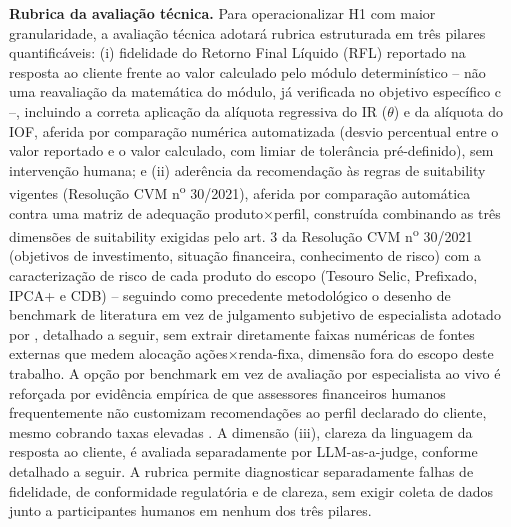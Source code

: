 \textbf{Rubrica da avalia\c{c}\~ao t\'ecnica.} Para operacionalizar H1
com maior granularidade, a avalia\c{c}\~ao t\'ecnica adotar\'a rubrica
estruturada em tr\^es pilares quantific\'aveis: (i) fidelidade do Retorno
Final L\'iquido (RFL) reportado na resposta ao cliente frente ao valor
calculado pelo m\'odulo determin\'istico -- n\~ao uma reavalia\c{c}\~ao
da matem\'atica do m\'odulo, j\'a verificada no objetivo espec\'ifico c
--, incluindo a correta aplica\c{c}\~ao da al\'iquota regressiva do IR
($\theta$) e da al\'iquota do IOF, aferida por compara\c{c}\~ao num\'erica
automatizada (desvio percentual entre o valor reportado e o valor
calculado, com limiar de toler\^ancia pr\'e-definido), sem interven\c{c}\~ao
humana; e (ii) ader\^encia da recomenda\c{c}\~ao \`as regras de
suitability vigentes (Resolu\c{c}\~ao CVM n\textsuperscript{o} 30/2021),
aferida por compara\c{c}\~ao autom\'atica contra uma matriz de adequa\c{c}\~ao
produto$\times$perfil, constru\'ida combinando as tr\^es dimens\~oes de
suitability exigidas pelo art. 3\textordmasculine{} da Resolu\c{c}\~ao CVM
n\textsuperscript{o} 30/2021 (objetivos de investimento, situa\c{c}\~ao
financeira, conhecimento de risco) com a caracteriza\c{c}\~ao de risco de
cada produto do escopo (Tesouro Selic, Prefixado, IPCA+ e CDB) -- seguindo
como precedente metodol\'ogico o desenho de benchmark de literatura em vez
de julgamento subjetivo de especialista adotado por \textcite{oehler2024},
detalhado a seguir, sem extrair diretamente faixas num\'ericas de fontes
externas que medem aloca\c{c}\~ao a\c{c}\~oes$\times$renda-fixa, dimens\~ao
fora do escopo deste trabalho. A op\c{c}\~ao por benchmark em vez de
avalia\c{c}\~ao por especialista ao vivo \'e reforçada por evid\^encia
emp\'irica de que assessores financeiros humanos frequentemente n\~ao
customizam recomenda\c{c}\~oes ao perfil declarado do cliente, mesmo
cobrando taxas elevadas \autocite{foerster2017}. A dimens\~ao (iii), clareza da
linguagem da resposta ao cliente, \'e avaliada separadamente por
LLM-as-a-judge, conforme detalhado a seguir. A rubrica permite
diagnosticar separadamente falhas de fidelidade, de conformidade
regulat\'oria e de clareza, sem exigir coleta de dados junto a
participantes humanos em nenhum dos tr\^es pilares.

